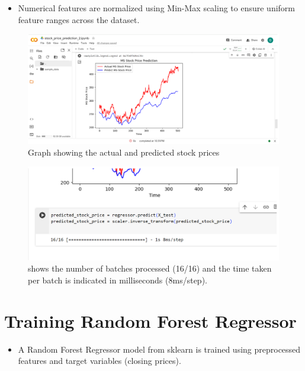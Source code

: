 \documentclass{article}
\begin{document}
\begin{itemize}
  \item Numerical features are normalized using Min-Max scaling to ensure uniform feature ranges across the dataset.

\end{itemize}
 \begin{figure}
     \centering
     \includegraphics[width=1\linewidth]{Capture10.PNG}
     \caption{Graph showing the actual and predicted stock prices}
     \label{fig:enter-label}
 \end{figure}

\begin{figure}
    \centering
    \includegraphics[width=1\linewidth]{Capture11.PNG}
    \caption{shows the number of batches processed (16/16) and the time taken per batch is indicated in milliseconds (8ms/step). }
    \label{fig:enter-label}
\end{figure}
\section{Training Random Forest Regressor}
\begin{itemize}
  \item  A Random Forest Regressor model from sklearn is trained using preprocessed features and target variables (closing prices).

\end{itemize}
\end{document}
